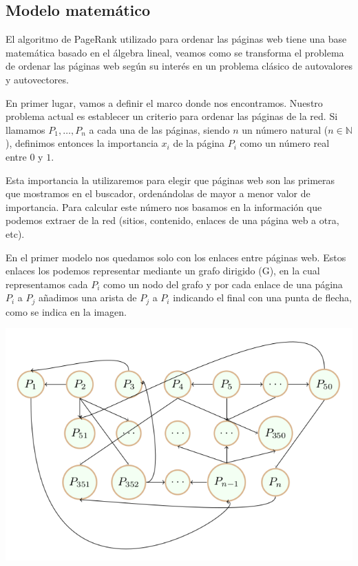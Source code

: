 \documentclass[size=a4, parskip=half, titlepage=false, toc=flat, toc=bib, 12pt]{scrartcl}
\theoremstyle{theorem-style}
\theoremstyle{definition-style}
\theoremstyle{remark-style}
\theoremstyle{example-style}
\theoremstyle{definition-style}
\theoremstyle{remark-style}
\begin{document}
\begin{itemize}
\end{itemize}

\subsection{Modelo matemático}

El algoritmo de PageRank utilizado para ordenar las páginas web tiene una base matemática basado en el álgebra lineal, veamos como se transforma el problema de ordenar las páginas web según su interés en un problema clásico de autovalores y autovectores.

En primer lugar, vamos a definir el marco donde nos encontramos. Nuestro problema actual es establecer un criterio para ordenar las páginas de la red. Si llamamos $P_1, \dots, P_n$ a cada una de las páginas, siendo $n$ un número natural ($n \in \mathbb{N}$), definimos entonces la importancia $x_i$  de la página $P_i$ como un número real entre $0$ y $1$.

Esta importancia la utilizaremos para elegir que páginas web son las primeras que mostramos en el buscador, ordenándolas de mayor  a menor valor de importancia.
Para calcular este número nos basamos en la información que podemos extraer de la red (sitios, contenido, enlaces de una página web a otra, etc).

En el primer modelo nos quedamos solo con los enlaces entre páginas web. Estos enlaces los podemos representar mediante un grafo dirigido (G), en la cual representamos cada $P_i$ como un nodo del grafo y por cada enlace de una página $P_i$ a $P_j$ añadimos una arista de $P_j$ a $P_i$ indicando el final con una punta de flecha, como se indica en la imagen.

\includegraphics[width=1.0\textwidth]{./img/grafoini}
\end{document}
